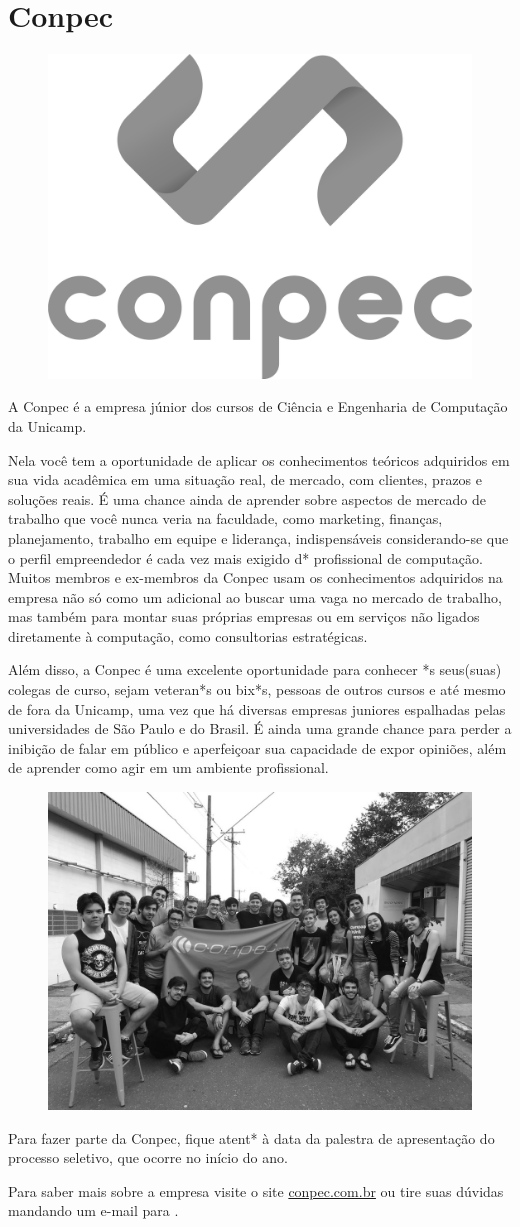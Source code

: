 
\section{Conpec}

\begin{figure}[H]
    \centering
    \includegraphics[width=.35\textwidth]{img/alem_da_graduacao/conpec_logo.png}
\end{figure}

A Conpec é a empresa júnior dos cursos de Ciência e Engenharia de Computação da
Unicamp.

Nela você tem a oportunidade de aplicar os conhecimentos teóricos adquiridos em
sua vida acadêmica em uma situação real, de mercado, com clientes, prazos e
soluções reais. É uma chance ainda de aprender sobre aspectos de mercado de
trabalho que você nunca veria na faculdade, como marketing, finanças,
planejamento, trabalho em equipe e liderança, indispensáveis considerando-se que
o perfil empreendedor é cada vez mais exigido d* profissional de computação.
Muitos membros e ex-membros da Conpec usam os conhecimentos adquiridos na
empresa não só como um adicional ao buscar uma vaga no mercado de trabalho, mas
também para montar suas próprias empresas ou em serviços não ligados diretamente
à computação, como consultorias estratégicas.

Além disso, a Conpec é uma excelente oportunidade para conhecer *s seus(suas)
colegas de curso, sejam veteran*s ou bix*s, pessoas de outros cursos e até mesmo
de fora da Unicamp, uma vez que há diversas empresas juniores espalhadas pelas
universidades de São Paulo e do Brasil. É ainda uma grande chance para perder a
inibição de falar em público e aperfeiçoar sua capacidade de expor opiniões,
além de aprender como agir em um ambiente profissional.

\begin{figure}[H]
    \centering
    \includegraphics[width=.45\textwidth]{img/alem_da_graduacao/conpec_foto.jpg}
\end{figure}

Para fazer parte da Conpec, fique atent* à data da palestra de apresentação do
processo seletivo, que ocorre no início do ano.

Para saber mais sobre a empresa visite o site \url{conpec.com.br} ou tire suas
dúvidas mandando um e-mail para .
